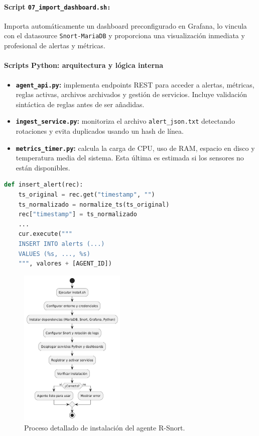 \documentclass[11pt,a4paper,twoside]{report}
\begin{document}
\paragraph{Script \texttt{07\_import\_dashboard.sh:}} Importa automáticamente un dashboard preconfigurado en Grafana, lo vincula con el datasource \texttt{Snort-MariaDB} y proporciona una visualización inmediata y profesional de alertas y métricas.

\paragraph{Scripts Python: arquitectura y lógica interna}

\begin{itemize}
	\item \textbf{\texttt{agent\_api.py}:} implementa endpoints REST para acceder a alertas, métricas, reglas activas, archivos archivados y gestión de servicios. Incluye validación sintáctica de reglas antes de ser añadidas.
	\item \textbf{\texttt{ingest\_service.py}:} monitoriza el archivo \texttt{alert\_json.txt} detectando rotaciones y evita duplicados usando un hash de línea.
	\item \textbf{\texttt{metrics\_timer.py}:} calcula la carga de CPU, uso de RAM, espacio en disco y temperatura media del sistema. Esta última es estimada si los sensores no están disponibles.
\end{itemize}

\begin{lstlisting}[language=Python, caption={Fragmento de inserción de alerta en ingest\_service.py}]
	def insert_alert(rec):
	ts_original = rec.get("timestamp", "")
	ts_normalizado = normalize_ts(ts_original)
	rec["timestamp"] = ts_normalizado
	...
	cur.execute("""
	INSERT INTO alerts (...)
	VALUES (%s, ..., %s)
	""", valores + [AGENT_ID])
\end{lstlisting}

\begin{figure}[H]
	\centering
	 \includegraphics[width=0.45\textwidth]{documento/29.png}
	\caption{Proceso detallado de instalación del agente R-Snort.}
	\label{fig:bpmn-snort-agent}
\end{figure}
\end{document}
